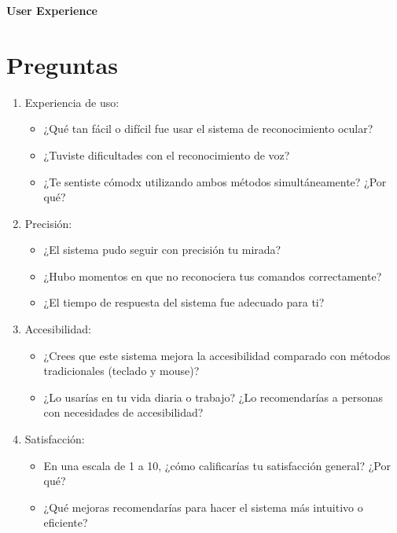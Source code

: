 \documentclass[letterpaper, 12pt]{article}
\date{}
\begin{document}
\begin{center}
    {\Large \textbf{User Experience}\par}
\end{center}
\medskip


\section*{Preguntas}


\begin{enumerate}[label=\textbf{\arabic*.}]
	\item Experiencia de uso:
    \begin{itemize}
        \item ¿Qué tan fácil o difícil fue usar el sistema de reconocimiento ocular?
        \item ¿Tuviste dificultades con el reconocimiento de voz?
        \item ¿Te sentiste cómodx utilizando ambos métodos simultáneamente? ¿Por qué?
    \end{itemize}
	\item Precisión:
    \begin{itemize}
        \item ¿El sistema pudo seguir con precisión tu mirada?
        \item ¿Hubo momentos en que no reconociera tus comandos correctamente?
        \item ¿El tiempo de respuesta del sistema fue adecuado para ti?
    \end{itemize}
	
	\item Accesibilidad:
    \begin{itemize}
        \item ¿Crees que este sistema mejora la accesibilidad comparado con métodos tradicionales (teclado y mouse)?
        \item ¿Lo usarías en tu vida diaria o trabajo? ¿Lo recomendarías a personas con necesidades de accesibilidad?
    \end{itemize}

	\item Satisfacción:
    \begin{itemize}
        \item En una escala de 1 a 10, ¿cómo calificarías tu satisfacción general? ¿Por qué?
        \item ¿Qué mejoras recomendarías para hacer el sistema más intuitivo o eficiente?
    \end{itemize}
\end{enumerate}
\end{document}
